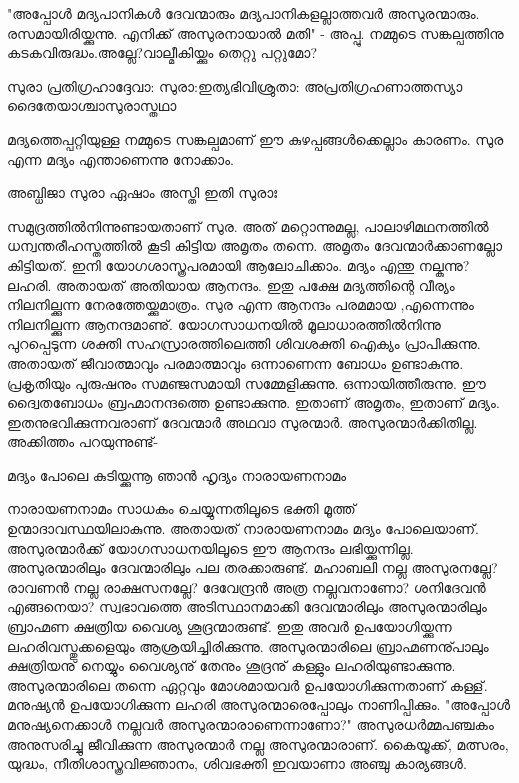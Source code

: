 "അപ്പോൾ മദ്യപാനികൾ ദേവന്മാരും മദ്യപാനികളല്ലാത്തവർ അസുരന്മാരും. രസമായിരിയ്ക്കുന്നു. എനിക്ക് അസുരനായാൽ മതി" - അപ്പു.
നമ്മുടെ സങ്കല്പത്തിനു കടകവിരുദ്ധം.അല്ലേ?വാല്മീകിയ്ക്കും തെറ്റു പറ്റുമോ?
\begin{minipage}{\linewidth}
\begin{center}
സുരാ പ്രതിഗ്രഹാദ്ദേവാ:
സുരാ:ഇത്യഭിവിശ്രുതാ:
അപ്രതിഗ്രഹണാത്തസ്യാ
ദൈതേയാശ്ചാസുരാസ്തഥാ
\end{center}
\end{minipage}
മദ്യത്തെപ്പറ്റിയുള്ള നമ്മുടെ സങ്കല്പമാണ്‌ ഈ കുഴപ്പങ്ങൾക്കെല്ലാം കാരണം. സുര എന്ന മദ്യം എന്താണെന്നു നോക്കാം. 
\begin{center}
അബ്ധിജാ സുരാ ഏഷാം അസ്തി ഇതി സുരാഃ
\end{center}
സമുദ്രത്തിൽനിന്നുണ്ടായതാണ്‌ സുര. അത് മറ്റൊന്നുമല്ല, പാലാഴിമഥനത്തിൽ ധന്വന്തരീഹസ്തത്തിൽ കൂടി കിട്ടിയ അമൃതം തന്നെ. അമൃതം ദേവന്മാർക്കാണല്ലോ കിട്ടിയത്. ഇനി യോഗശാസ്ത്രപരമായി ആലോചിക്കാം. മദ്യം എന്തു നല്കുന്നു? ലഹരി. അതായത് അതിയായ ആനന്ദം. ഇതു പക്ഷേ മദ്യത്തിന്റെ വീര്യം നിലനില്ക്കുന്ന നേരത്തേയ്ക്കുമാത്രം. സുര എന്ന ആനന്ദം പരമമായ ,എന്നെന്നും നിലനില്ക്കുന്ന ആനന്ദമാണു്. യോഗസാധനയിൽ മൂലാധാരത്തിൽനിന്നു പുറപ്പെടുന്ന ശക്തി സഹസ്രാരത്തിലെത്തി ശിവശക്തി ഐക്യം പ്രാപിക്കുന്നു. അതായത് ജീവാത്മാവും പരമാത്മാവും ഒന്നാണെന്ന ബോധം ഉണ്ടാകുന്നു. പ്രകൃതിയും പുരുഷനും സമഞ്ജസമായി സമ്മേളിക്കുന്നു. ഒന്നായിത്തീരുന്നു. ഈ ദ്വൈതബോധം ബ്രഹ്മാനന്ദത്തെ ഉണ്ടാക്കുന്നു. ഇതാണ്‌ അമൃതം, ഇതാണ്‌ മദ്യം. ഇതനുഭവിക്കുന്നവരാണ്‌ ദേവന്മാർ അഥവാ സുരന്മാർ. അസുരന്മാർക്കിതില്ല.
അക്കിത്തം പറയുന്നുണ്ട്-
\begin{center}
\hspace{2em}മദ്യം പോലെ കുടിയ്ക്കുന്നൂ ഞാൻ
\hspace{2em}ഹൃദ്യം നാരായണനാമം
\end{center}
നാരായണനാമം സാധകം ചെയ്യുന്നതിലൂടെ ഭക്തി മൂത്ത് ഉന്മാദാവസ്ഥയിലാകുന്നു. അതായത് നാരായണനാമം മദ്യം പോലെയാണ്‌. അസുരന്മാർക്ക് യോഗസാധനയിലൂടെ ഈ ആനന്ദം ലഭിയ്ക്കുന്നില്ല. അസുരന്മാരിലും ദേവന്മാരിലും പല തരക്കാരുണ്ട്. മഹാബലി നല്ല അസുരനല്ലേ? രാവണൻ നല്ല രാക്ഷസനല്ലേ? ദേവേന്ദ്രൻ അത്ര നല്ലവനാണോ? ശനിദേവൻ എങ്ങനെയാ? സ്വഭാവത്തെ അടിസ്ഥാനമാക്കി ദേവന്മാരിലും അസുരന്മാരിലും ബ്രാഹ്മണ ക്ഷത്രിയ വൈശ്യ ശൂദ്രന്മാരുണ്ട്. ഇതു അവർ ഉപയോഗിയ്ക്കുന്ന ലഹരിവസ്തുക്കളെയും ആശ്രയിച്ചിരിക്കുന്നു. അസുരന്മാരിലെ ബ്രാഹ്മണനു്പാലും ക്ഷത്രിയനു് നെയ്യും വൈശ്യനു് തേനും ശൂദ്രനു് കള്ളും ലഹരിയുണ്ടാക്കുന്നു. അസുരന്മാരിലെ തന്നെ ഏറ്റവും മോശമായവർ ഉപയോഗിക്കുന്നതാണ്‌ കള്ള്. മനുഷ്യൻ ഉപയോഗിക്കുന്ന ലഹരി അസുരന്മാരെപ്പോലും നാണിപ്പിക്കും.
"അപ്പോൾ മനുഷ്യനെക്കാൾ നല്ലവർ അസുരന്മാരാണെന്നാണോ?"
അസുരധർമ്മപഞ്ചകം അനുസരിച്ചു ജീവിക്കുന്ന അസുരന്മാർ നല്ല അസുരന്മാരാണ്‌. കൈയൂക്ക്, മത്സരം, യുദ്ധം, നീതിശാസ്ത്രവിജ്ഞാനം, ശിവഭക്തി ഇവയാണാ അഞ്ചു കാര്യങ്ങൾ.

